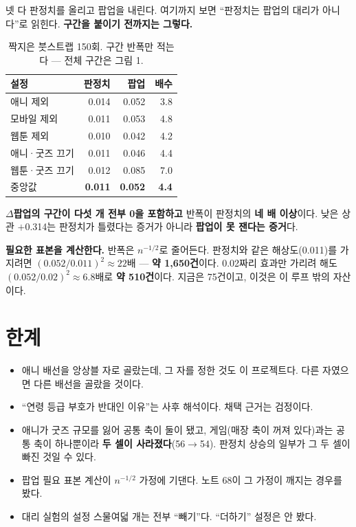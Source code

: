 \documentclass[10pt]{article}
\begin{document}
넷 다 판정치를 올리고 팝업을 내린다. 여기까지 보면 ``판정치는 팝업의 대리가
아니다''로 읽힌다. \textbf{구간을 붙이기 전까지는 그렇다.}

\begin{table}[t]
\centering\tsize
\caption{짝지은 붓스트랩 150회. 구간 반폭만 적는다 --- 전체 구간은 그림 1.}
\begin{tabular}{lrrr}
\toprule
설정 & 판정치 & 팝업 & 배수 \\
\midrule
애니 제외 & 0.014 & 0.052 & 3.8 \\
모바일 제외 & 0.011 & 0.053 & 4.8 \\
웹툰 제외 & 0.010 & 0.042 & 4.2 \\
애니·굿즈 끄기 & 0.011 & 0.046 & 4.4 \\
웹툰·굿즈 끄기 & 0.012 & 0.085 & 7.0 \\
\midrule
중앙값 & \textbf{0.011} & \textbf{0.052} & \textbf{4.4} \\
\bottomrule
\end{tabular}
\end{table}

\textbf{$\Delta$팝업의 구간이 다섯 개 전부 0을 포함하고} 반폭이 판정치의
\textbf{네 배 이상}이다. 낮은 상관 $+$0.314는 판정치가 틀렸다는 증거가 아니라
\textbf{팝업이 못 잰다는 증거}다.

\noindent\textbf{필요한 표본을 계산한다.}
반폭은 $n^{-1/2}$로 줄어든다. 판정치와 같은 해상도(0.011)를 가지려면
$(0.052/0.011)^2\approx22$배 --- \textbf{약 1,650건}이다. 0.02짜리 효과만
가리려 해도 $(0.052/0.02)^2\approx6.8$배로 \textbf{약 510건}이다. 지금은
75건이고, 이것은 이 루프 밖의 자산이다.


\section{한계}

\begin{itemize}[leftmargin=1.1em,itemsep=0.15em]
\item 애니 배선을 앙상블 자로 골랐는데, 그 자를 정한 것도 이 프로젝트다.
      다른 자였으면 다른 배선을 골랐을 것이다.
\item ``연령 등급 부호가 반대인 이유''는 사후 해석이다. 채택 근거는 검정이다.
\item 애니가 굿즈 규모를 잃어 공통 축이 둘이 됐고, 게임(매장 축이 꺼져 있다)과는
      공통 축이 하나뿐이라 \textbf{두 셀이 사라졌다}(56$\to$54). 판정치 상승의
      일부가 그 두 셀이 빠진 것일 수 있다.
\item 팝업 필요 표본 계산이 $n^{-1/2}$ 가정에 기댄다. 노트 68이 그 가정이 깨지는
      경우를 봤다.
\item 대리 실험의 설정 스물여덟 개는 전부 ``빼기''다. ``더하기'' 설정은 안 봤다.
\end{itemize}
\end{document}
